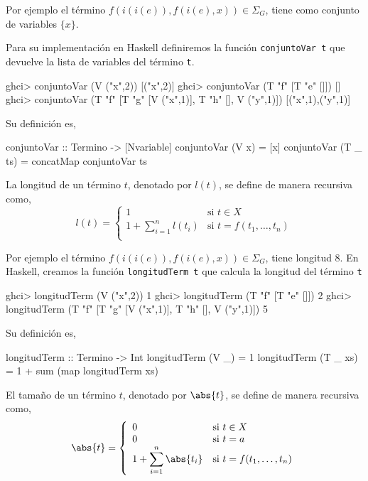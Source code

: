 Por ejemplo el término $f(i(i(e)),f(i(e),x)) \in \Sigma_G$, tiene como
conjunto de variables $\{x\}$.  

Para su implementación en Haskell definiremos la función
\texttt{conjuntoVar t} que devuelve la lista de variables del término
\texttt{t}.

\begin{sesion}
ghci> conjuntoVar (V ("x",2))
[("x",2)]
ghci> conjuntoVar (T "f" [T "e" []])
[]
ghci> conjuntoVar (T "f" [T "g" [V ("x",1)], T "h" [], V ("y",1)])
[("x",1),("y",1)]
\end{sesion}

Su definición es,

\begin{codigo}
conjuntoVar :: Termino -> [Nvariable]
conjuntoVar (V x)    = [x]
conjuntoVar (T _ ts) = concatMap conjuntoVar ts
\end{codigo}

\begin{defi} La longitud de un término $t$, denotado por $l(t)$, se
  define de manera recursiva como,
  \begin{equation*}
    l(t)=
    \left\lbrace
      \begin{array}{ll}
        1 & \text{si } t \in X \\
        1 + \displaystyle \sum^n_{i=1} l(t_i) & \text{si } t = f(t_1, \dots, t_n)\\
      \end{array}
    \right.
  \end{equation*}
\end{defi}

Por ejemplo el término $f(i(i(e)),f(i(e),x)) \in \Sigma_G$, tiene
longitud 8.  
En Haskell, creamos la función \texttt{longitudTerm t} que
calcula la longitud del término \texttt{t}

\begin{sesion}
ghci> longitudTerm (V ("x",2))
1
ghci> longitudTerm (T "f" [T "e" []])
2
ghci> longitudTerm (T "f" [T "g" [V ("x",1)], T "h" [], V ("y",1)])
5
\end{sesion}

Su definición es,

\begin{codigo}
longitudTerm :: Termino -> Int
longitudTerm (V _)    = 1
longitudTerm (T _ xs) = 1 + sum (map longitudTerm xs)
\end{codigo}

\begin{defi} El tamaño de un término $t$, denotado por $\abs{t} $, se
  define de manera recursiva como,
  \begin{equation*}
    \abs{t}=
    \left\lbrace
      \begin{array}{ll}
        0 & \text{si } t \in X \\
        0 & \text{si } t = a \\
        1 + \displaystyle \sum^n_{i=1} \abs{t_i} & \text{si } t = f(t_1, \dots, t_n)\\
      \end{array}
    \right.
  \end{equation*}
\end{defi}

